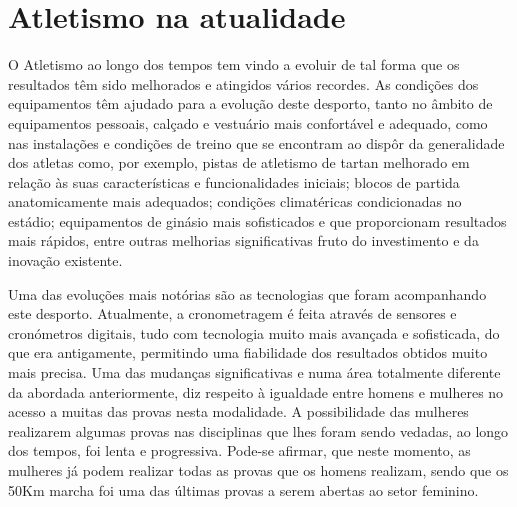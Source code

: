 \documentclass{report}
\begin{document}
    \section{Atletismo na atualidade}
    O Atletismo ao longo dos tempos tem vindo a evoluir de tal forma que os resultados têm sido melhorados e atingidos vários recordes. As condições dos equipamentos têm ajudado para a evolução deste desporto, tanto no âmbito de equipamentos pessoais, calçado e vestuário mais confortável e adequado, como nas instalações e condições de treino que se encontram ao dispôr da generalidade dos atletas como, por exemplo,  pistas de atletismo de tartan melhorado em relação às suas características e funcionalidades iniciais; blocos de partida anatomicamente mais adequados; condições climatéricas condicionadas no estádio; equipamentos de ginásio mais sofisticados e que proporcionam resultados mais rápidos, entre outras melhorias significativas fruto do investimento e da inovação existente. \par
    Uma das evoluções mais notórias são as tecnologias que foram acompanhando este desporto. Atualmente,  a cronometragem é feita através de sensores e cronómetros digitais, tudo com tecnologia muito mais avançada e sofisticada, do que era antigamente, permitindo uma fiabilidade dos resultados obtidos muito mais precisa.
    Uma das mudanças significativas e numa área totalmente diferente da abordada anteriormente, diz respeito à igualdade entre homens e mulheres no acesso a muitas das provas nesta modalidade.  A possibilidade das mulheres realizarem algumas provas nas disciplinas que lhes foram sendo vedadas, ao longo dos tempos, foi lenta e progressiva. Pode-se afirmar, que neste momento, as mulheres já podem realizar todas as provas que os homens realizam, sendo que os 50Km marcha foi uma das últimas provas a serem abertas ao setor feminino. \cite{origemdoatletismo}
    
    \hfill \newline
    \hfill \newline
    
\end{document}
